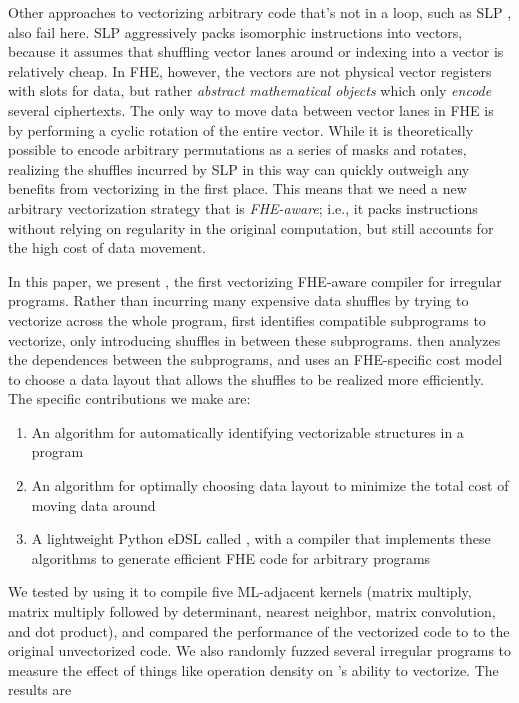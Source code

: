 Other approaches to vectorizing arbitrary code that's not in a loop, such as SLP \cite{SLP}, also fail here.
SLP aggressively packs isomorphic instructions into vectors, because it assumes that shuffling vector lanes around or indexing into a vector is relatively cheap.
In FHE, however, the vectors are not physical vector registers with slots for data, but rather {\em abstract mathematical objects} which only {\em encode} several ciphertexts.
The only way to move data between vector lanes in FHE is by performing a cyclic rotation of the entire vector.
While it is theoretically possible to encode arbitrary permutations as a series of masks and rotates, realizing the shuffles incurred by SLP in this way can quickly outweigh any benefits from vectorizing in the first place.
This means that we need a new arbitrary vectorization strategy that is {\em FHE-aware}; i.e., it packs instructions without relying on regularity in the original computation, but still accounts for the high cost of data movement.

In this paper, we present \system, the first vectorizing FHE-aware compiler for irregular programs.
Rather than incurring many expensive data shuffles by trying to vectorize across the whole program, \system first identifies compatible subprograms to vectorize, only introducing shuffles in between these subprograms.
\system then analyzes the dependences between the subprograms, and uses an FHE-specific cost model to choose a data layout that allows the shuffles to be realized more efficiently.
The specific contributions we make are:
\begin{enumerate}
    \item An algorithm for automatically identifying vectorizable structures in a program
    \item An algorithm for optimally choosing data layout to minimize the total cost of moving data around
    \item A lightweight Python eDSL called \system, with a compiler that implements these algorithms to generate efficient FHE code for arbitrary programs 
\end{enumerate}

We tested \system by using it to compile five ML-adjacent kernels (matrix multiply, matrix multiply followed by determinant, nearest neighbor, matrix convolution, and dot product), and compared the performance of the vectorized code to to the original unvectorized code.
We also randomly fuzzed several irregular programs to measure the effect of things like operation density on \system's ability to vectorize. 
The results are 
